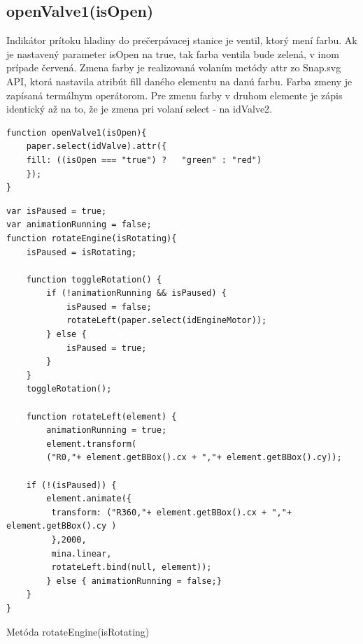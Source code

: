  
\subsection{openValve1(isOpen)}
Indikátor prítoku hladiny do prečerpávacej stanice je ventil, ktorý mení farbu. Ak je nastavený parameter isOpen na true, tak farba ventila bude zelená, v inom prípade červená. 
Zmena farby je realizovaná volaním metódy attr zo Snap.svg API, ktorá nastavila atribút fill daného elementu na danú farbu. Farba zmeny je zapísaná termálnym operátorom. 
Pre zmenu farby v druhom elemente je zápis identický až na to, že je zmena pri volaní select - na idValve2. 
\begin{lstlisting}
function openValve1(isOpen){
	paper.select(idValve).attr({
	fill: ((isOpen === "true") ?   "green" : "red")
	});
}
\end{lstlisting}






\begin{lstlisting}
var isPaused = true;
var animationRunning = false;
function rotateEngine(isRotating){
	isPaused = isRotating;

	function toggleRotation() {
		if (!animationRunning && isPaused) {
			isPaused = false;
			rotateLeft(paper.select(idEngineMotor));
		} else {
			isPaused = true;
		}
	}
	toggleRotation();

	function rotateLeft(element) {
		animationRunning = true;
		element.transform(
		("R0,"+ element.getBBox().cx + ","+ element.getBBox().cy));

	if (!(isPaused)) {
		element.animate({
		 transform: ("R360,"+ element.getBBox().cx + ","+  element.getBBox().cy )
		 },2000, 
		 mina.linear, 
		 rotateLeft.bind(null, element));
		} else { animationRunning = false;}
	}
}
\end{lstlisting}
\caption{Metóda rotateEngine(isRotating)}








